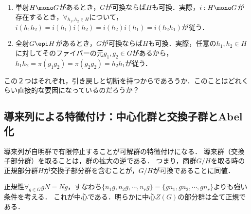 \documentclass[uplatex,dvipdfmx]{jsreport}
\begin{document}
\begin{remark}[Abel性についての証明抽出]\mbox{}
    \begin{enumerate}
        \item 単射$H\mono G$があるとき，$G$が可換ならば$H$も可換．実際，$i:H\mono G$が存在するとき，$\forall_{h_1,h_2\in H}$について，$i(h_1h_2)=i(h_1)i(h_2)=i(h_2)i(h_1)=i(h_2h_1)$が従う．
        \item 全射$G\epi H$があるとき，$G$が可換ならば$H$も可換．実際，任意の$h_1,h_2\in H$に対してそのファイバーの元$g_1,g_2\in G$があるから，$h_1h_2=\pi(g_1g_2)=\pi(g_2g_2)=h_2h_1$が従う．
    \end{enumerate}
    この２つはそれぞれ，引き戻しと切断を持つからであろうか．このことはどれくらい直接的な要因になっているのだろうか？
\end{remark}

\subsection{導来列による特徴付け：中心化群と交換子群とAbel化}

\begin{tcolorbox}[colframe=ForestGreen, colback=ForestGreen!10!white,breakable,colbacktitle=ForestGreen!40!white,coltitle=black,fonttitle=\bfseries\sffamily,
title=]
    導来列が自明群で有限停止することが可解群の特徴付けになる．
    導来群（交換子部分群）を取ることは，群の拡大の逆である．
    つまり，商群$G/H$を取る時の正規部分群$H$が交換子部分群を含むことが，$G/H$が可換であることに同値．
\end{tcolorbox}

\begin{tcolorbox}[colframe=ForestGreen, colback=ForestGreen!10!white,breakable,colbacktitle=ForestGreen!40!white,coltitle=black,fonttitle=\bfseries\sffamily,
    title=群構造の持ち上げに続いて，可換性の持ち上げ]
        正規性$\forall_{g\in G}gN=Ng$，すなわち$\{n_1g,n_2g,\cdots,n_rg\}=\{gn_1,gn_2,\cdots,gn_r\}$よりも強い条件を考える．
        これが中心である．明らかに中心$Z(G)$の部分群は全て正規である．
\end{tcolorbox}
\end{document}
